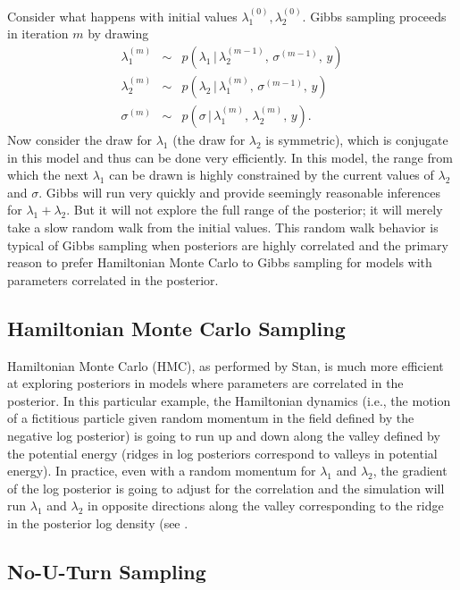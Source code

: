 Consider what happens with initial values $\lambda_1^{(0)}, \lambda_2^{(0)}$.
Gibbs sampling proceeds in iteration $m$ by drawing
%
\begin{eqnarray*}
\lambda_1^{(m)} 
& \sim & p(\lambda_1 \, | \, \lambda_2^{(m-1)}, \, \sigma^{(m-1)}, \, y)
\\[6pt]
\lambda_2^{(m)}
& \sim & p(\lambda_2 \, | \, \lambda_1^{(m)}, \, \sigma^{(m-1)}, \, y)
\\[6pt]
\sigma^{(m)} 
& \sim & p(\sigma \, | \, \lambda_1^{(m)}, \, \lambda_2^{(m)}, \, y).
\end{eqnarray*}
%
Now consider the draw for $\lambda_1$ (the draw for $\lambda_2$ is
symmetric), which is conjugate in this model and thus can be done very
efficiently.  In this model, the range from which the next $\lambda_1$
can be drawn is highly constrained by the current values of
$\lambda_2$ and $\sigma$.  Gibbs will run very quickly and provide
seemingly reasonable inferences for $\lambda_1 + \lambda_2$.  But it
will not explore the full range of the posterior; it will merely take
a slow random walk from the initial values.  This random walk behavior
is typical of Gibbs sampling when posteriors are highly correlated and
the primary reason to prefer Hamiltonian Monte Carlo to Gibbs sampling
for models with parameters correlated in the posterior.

\subsection{Hamiltonian Monte Carlo Sampling}

Hamiltonian Monte Carlo (HMC), as performed by Stan, is much more
efficient at exploring posteriors in models where parameters are
correlated in the posterior.  In this particular example, the
Hamiltonian dynamics (i.e., the motion of a fictitious particle given
random momentum in the field defined by the negative log posterior) is
going to run up and down along the valley defined by the potential
energy (ridges in log posteriors correspond to valleys in potential
energy).  In practice, even with a random momentum for $\lambda_1$ and
$\lambda_2$, the gradient of the log posterior is going to adjust for
the correlation and the simulation will run $\lambda_1$ and
$\lambda_2$ in opposite directions along the valley corresponding to
the ridge in the posterior log density (see
.  

\subsection{No-U-Turn Sampling}

